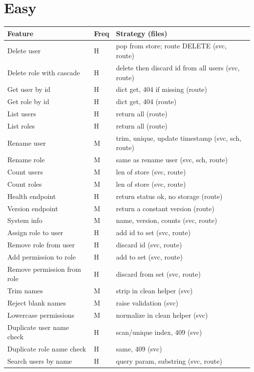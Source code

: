 \documentclass[11pt,a4paper]{report}
\begin{document}
\section{Easy}
\begin{longtable}{p{} p{} p{}}
\textbf{Feature} & \textbf{Freq} & \textbf{Strategy (files)} \\
\hline
\endhead
Delete user & H & pop from store; route DELETE (svc, route) \\
Delete role with cascade & H & delete then discard id from all users (svc, route) \\
Get user by id & H & dict get, 404 if missing (route) \\
Get role by id & H & dict get, 404 (route) \\
List users & H & return all (route) \\
List roles & H & return all (route) \\
Rename user & M & trim, unique, update timestamp (svc, sch, route) \\
Rename role & M & same as rename user (svc, sch, route) \\
Count users & M & len of store (svc, route) \\
Count roles & M & len of store (svc, route) \\
Health endpoint & H & return status ok, no storage (route) \\
Version endpoint & M & return a constant version (route) \\
System info & M & name, version, counts (svc, route) \\
Assign role to user & H & add id to set (svc, route) \\
Remove role from user & H & discard id (svc, route) \\
Add permission to role & H & add to set (svc, route) \\
Remove permission from role & H & discard from set (svc, route) \\
Trim names & M & strip in clean helper (svc) \\
Reject blank names & M & raise validation (svc) \\
Lowercase permissions & M & normalize in clean helper (svc) \\
Duplicate user name check & H & scan/unique index, 409 (svc) \\
Duplicate role name check & H & same, 409 (svc) \\
Search users by name & H & query param, substring (svc, route) \\

\end{longtable}
\end{document}
